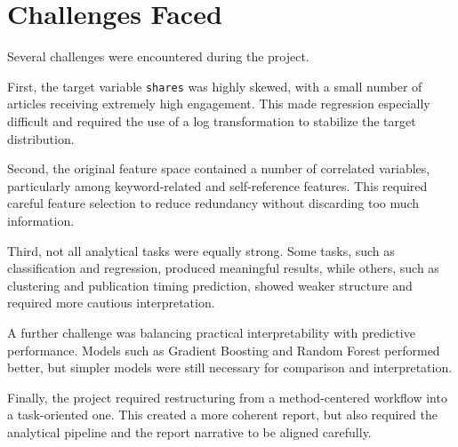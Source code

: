 \section{Challenges Faced}

Several challenges were encountered during the project.

First, the target variable \texttt{shares} was highly skewed, with a small number of articles receiving extremely high engagement. This made regression especially difficult and required the use of a log transformation to stabilize the target distribution.

Second, the original feature space contained a number of correlated variables, particularly among keyword-related and self-reference features. This required careful feature selection to reduce redundancy without discarding too much information.

Third, not all analytical tasks were equally strong. Some tasks, such as classification and regression, produced meaningful results, while others, such as clustering and publication timing prediction, showed weaker structure and required more cautious interpretation.

A further challenge was balancing practical interpretability with predictive performance. Models such as Gradient Boosting and Random Forest performed better, but simpler models were still necessary for comparison and interpretation.

Finally, the project required restructuring from a method-centered workflow into a task-oriented one. This created a more coherent report, but also required the analytical pipeline and the report narrative to be aligned carefully.
